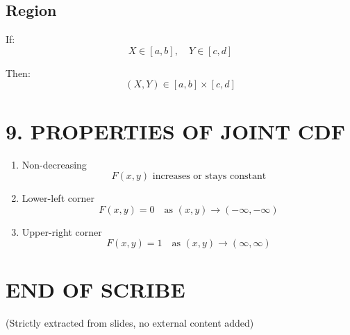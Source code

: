 \documentclass[12pt]{article}
\begin{document}
\subsection*{Region}
If:
\[
X \in [a,b], \quad Y \in [c,d]
\]

Then:
\[
(X,Y) \in [a,b] \times [c,d]
\]

\section*{9. PROPERTIES OF JOINT CDF}

\begin{enumerate}
\item Non-decreasing
\[
F(x,y) \text{ increases or stays constant}
\]

\item Lower-left corner
\[
F(x,y) = 0 \quad \text{as } (x,y) \to (-\infty,-\infty)
\]

\item Upper-right corner
\[
F(x,y) = 1 \quad \text{as } (x,y) \to (\infty,\infty)
\]
\end{enumerate}

\section*{END OF SCRIBE}

(Strictly extracted from slides, no external content added)
\end{document}
